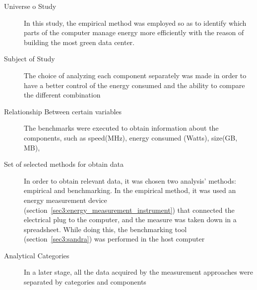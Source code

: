     \begin{description}
    \item[Universe o Study] 
    In this study, the empirical method was employed so as to identify which parts of the computer manage energy more efficiently with the reason of building the most green data center. 
    
    \item[Subject of Study]
    The choice of analyzing each component separately was made in order to have a better control of the energy consumed and the ability to compare the different combination 
    
    \item[Relationship Between certain variables]
    The benchmarks were executed to obtain information about the components, such as speed(MHz), energy consumed (Watts), size(GB, MB), 
    
    \item[Set of selected methods for obtain data] 
    In order to obtain relevant data, it was chosen two analysis' methods: empirical and benchmarking. In the empirical method, it was used an energy measurement device (section~\ref{sec3:energy_measurement_instrument}) that connected the electrical plug to the computer, and the measure was taken down in a spreadsheet. While doing this, the benchmarking tool (section~\ref{sec3:sandra}) was performed in the host computer
    
    
    \item[Analytical Categories]
    In a later stage, all the data acquired by the measurement approaches were separated by categories and components
    
    \end{description}
    

